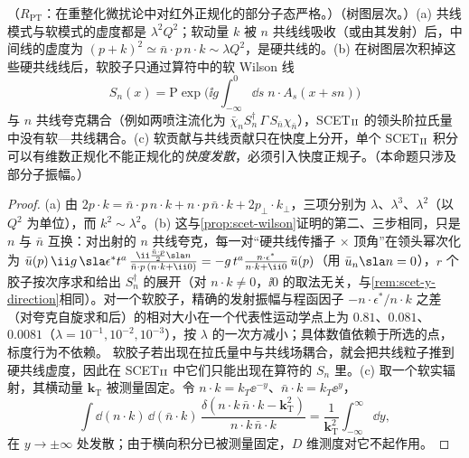 \begin{proposition}\label{prop:scet-scet2}
（$R_{\mathrm{PT}}$：在重整化微扰论中对红外正规化的部分子态严格。）（树图层次。）(a) 共线模式与软模式的虚度都是 $\lambda^2Q^2$；软动量 $k$ 被 $n$ 共线线吸收（或由其发射）后，中间线的虚度为 $(p+k)^2\simeq\bar n\cdot p\,n\cdot k\sim\lambda Q^2$，是硬共线的。(b) 在树图层次积掉这些硬共线线后，软胶子只通过算符中的软 Wilson 线
\begin{equation}\label{eq:scet-Sn}
S_n(x)=\mathrm P\exp\Big(\ii g\int_{-\infty}^0\dd s\;n\cdot A_s(x+sn)\Big)
\end{equation}
与 $n$ 共线夸克耦合（例如两喷注流化为 $\bar\chi_nS_n^\dagger\,\Gamma\,S_{\bar n}\chi_{\bar n}$），SCET$_{\rm II}$ 的领头阶拉氏量中没有软—共线耦合。(c) 软贡献与共线贡献只在快度上分开，单个 SCET$_{\rm II}$ 积分可以有维数正规化不能正规化的\emph{快度发散}，必须引入快度正规子\cite{Hill:2002vw,BauerEtAl2002}。（本命题只涉及部分子振幅。）
\end{proposition}

\begin{proof}
(a) 由 $2p\cdot k=\bar n\cdot p\,n\cdot k+n\cdot p\,\bar n\cdot k+2p_\perp\cdot k_\perp$，三项分别为 $\lambda$、$\lambda^3$、$\lambda^2$（以 $Q^2$ 为单位），而 $k^2\sim\lambda^2$。(b) 这与\cref{prop:scet-wilson}证明的第二、三步相同，只是 $n$ 与 $\bar n$ 互换：对出射的 $n$ 共线夸克，每一对“硬共线传播子 × 顶角”在领头幂次化为 $\bar u(p)\,\ii g\,\sla\epsilon^*t^a\,\frac{\ii\frac{\bar n\cdot p}{2}\sla n}{\bar n\cdot p\,(n\cdot k+\ii0)}=-g\,t^a\frac{n\cdot\epsilon^*}{n\cdot k+\ii0}\,\bar u(p)$（用 $\bar u_n\sla n=0$），$r$ 个胶子按次序求和给出 $S_n^\dagger$ 的展开（对 $n\cdot k\neq0$，$\ii0$ 的取法无关，与\cref{rem:scet-y-direction}相同）。对一个软胶子，精确的发射振幅与程函因子 $-n\cdot\epsilon^*/n\cdot k$ 之差（对夸克自旋求和后）的相对大小在一个代表性运动学点上为 $0.81$、$0.081$、$0.0081$（$\lambda=10^{-1},10^{-2},10^{-3}$），按 $\lambda$ 的一次方减小；具体数值依赖于所选的点，标度行为不依赖。%
软胶子若出现在拉氏量中与共线场耦合，就会把共线粒子推到硬共线虚度，因此在 SCET$_{\rm II}$ 中它们只能出现在算符的 $S_n$ 里。(c) 取一个软实辐射，其横动量 $\bm k_{\mathrm T}$ 被测量固定。令 $n\cdot k=k_T\ee^{-y}$、$\bar n\cdot k=k_T\ee^{y}$，
\begin{equation}\label{eq:scet-rapdiv}
\int\dd(n\cdot k)\,\dd(\bar n\cdot k)\,\frac{\delta(n\cdot k\,\bar n\cdot k-\bm k_{\mathrm T}^2)}{n\cdot k\,\bar n\cdot k}=\frac{1}{\bm k_{\mathrm T}^2}\int_{-\infty}^{\infty}\dd y ,
\end{equation}
在 $y\to\pm\infty$ 处发散；由于横向积分已被测量固定，$D$ 维测度对它不起作用。
\end{proof}

